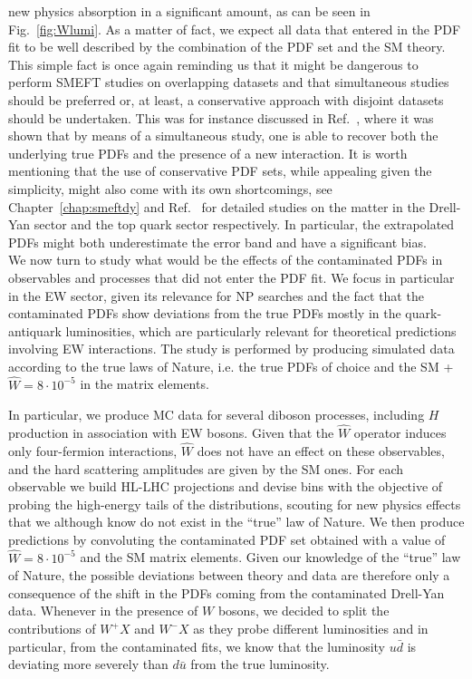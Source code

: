 \documentclass[withindex,glossary]{cam-thesis}
\begin{document}
new physics absorption in a significant amount, as can be seen in Fig.~\ref{fig:Wlumi}. 
As a matter of fact, we expect all data that entered in the PDF fit to be well described by the combination of the PDF set and the SM theory.
This simple fact is once again reminding us that it might be dangerous to perform SMEFT studies on overlapping datasets and that simultaneous studies should be preferred or, at least, a conservative approach with disjoint datasets should be undertaken. 
This was for instance discussed in Ref.~\cite{Iranipour:2022iak}, 
where it was shown that by means of a simultaneous study, one is able to recover 
both the underlying true PDFs and the presence of a new interaction. It is worth 
mentioning that the use of conservative PDF sets, while appealing given the simplicity, 
might also come with its own shortcomings, see Chapter~\ref{chap:smeftdy} and Ref.~\cite{Kassabov:2023hbm} for detailed studies on the matter in the 
Drell-Yan sector and the top quark sector respectively. In particular, 
the extrapolated PDFs might both underestimate the error band and
have a significant bias.\\

\noindent We now turn to study what would be the effects of the contaminated PDFs in observables and processes that did not enter the PDF fit.
We focus in particular in the EW sector, given its relevance for NP searches and the fact that the contaminated PDFs show deviations from 
the true PDFs mostly in the quark-antiquark luminosities, which are particularly relevant for theoretical predictions involving EW interactions.
%
The study is performed by producing simulated data according to the true laws of Nature, i.e. the true PDFs of choice and 
the SM + $\hat{W}=8\cdot 10^{-5}$ in the matrix elements. 

In particular, we 
produce MC data for several diboson processes, including $H$ production in association with EW bosons. 
Given that the $\hat{W}$ operator 
induces only four-fermion interactions, $\hat{W}$ does not have an effect on these observables, and the hard scattering 
amplitudes are given by the SM ones. For each observable we build HL-LHC projections and devise bins with the objective 
of probing the high-energy tails of the distributions, scouting for new physics effects that we although know do not exist in the ``true'' law of Nature.  
%
We then produce predictions by convoluting the contaminated PDF set obtained with a value of $\hat{W}=8\cdot 10^{-5}$ and the SM matrix elements. 
Given our knowledge of the ``true'' law of Nature, the possible deviations between theory and data are therefore
only a consequence of the shift in the PDFs coming from the contaminated Drell-Yan data.
Whenever in the presence of $W$ bosons, we decided to split the contributions of $W^+ X$ and $W^- X$ as they probe different luminosities and in particular, 
from the contaminated fits, we know that the luminosity $u \bar{d}$ is deviating more severely than $d \bar{u}$ from the true luminosity.
\end{document}
